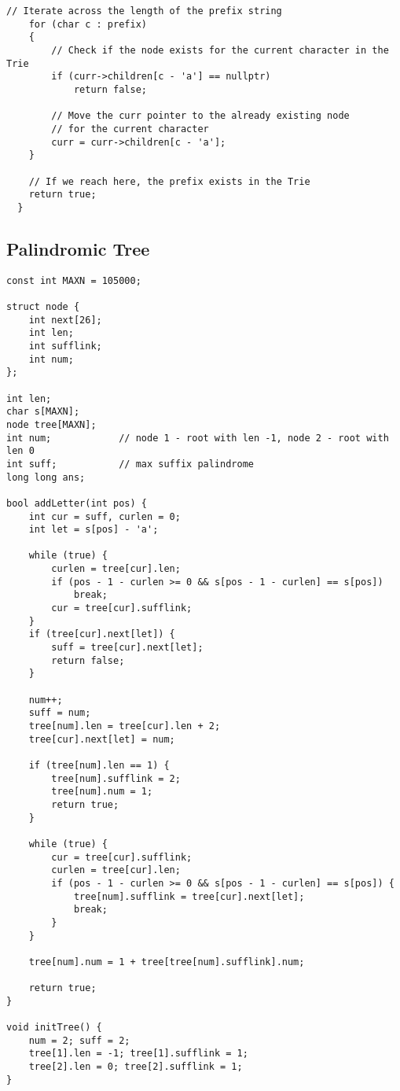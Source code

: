 \documentclass[10pt]{article}
\begin{document}
\begin{multicols*}{2}
\begin{lstlisting}[style=compactcpp]
    // Iterate across the length of the prefix string
    for (char c : prefix)
    {
        // Check if the node exists for the current character in the Trie
        if (curr->children[c - 'a'] == nullptr)
            return false;

        // Move the curr pointer to the already existing node
        // for the current character
        curr = curr->children[c - 'a'];
    }

    // If we reach here, the prefix exists in the Trie
    return true;
  }
\end{lstlisting}

\subsection{Palindromic Tree}

\begin{lstlisting}[style=compactcpp]
const int MAXN = 105000;

struct node {
    int next[26];
    int len;
    int sufflink;
    int num;
};

int len;
char s[MAXN];
node tree[MAXN]; 
int num;            // node 1 - root with len -1, node 2 - root with len 0
int suff;           // max suffix palindrome
long long ans;

bool addLetter(int pos) {
    int cur = suff, curlen = 0;
    int let = s[pos] - 'a';

    while (true) {
        curlen = tree[cur].len;
        if (pos - 1 - curlen >= 0 && s[pos - 1 - curlen] == s[pos])     
            break;  
        cur = tree[cur].sufflink;
    }       
    if (tree[cur].next[let]) {  
        suff = tree[cur].next[let];
        return false;
    }

    num++;
    suff = num;
    tree[num].len = tree[cur].len + 2;
    tree[cur].next[let] = num;

    if (tree[num].len == 1) {
        tree[num].sufflink = 2;
        tree[num].num = 1;
        return true;
    }

    while (true) {
        cur = tree[cur].sufflink;
        curlen = tree[cur].len;
        if (pos - 1 - curlen >= 0 && s[pos - 1 - curlen] == s[pos]) {
            tree[num].sufflink = tree[cur].next[let];
            break;
        }       
    }           

    tree[num].num = 1 + tree[tree[num].sufflink].num;

    return true;
}

void initTree() {
    num = 2; suff = 2;
    tree[1].len = -1; tree[1].sufflink = 1;
    tree[2].len = 0; tree[2].sufflink = 1;
}


\end{lstlisting}
\end{multicols*}
\end{document}

